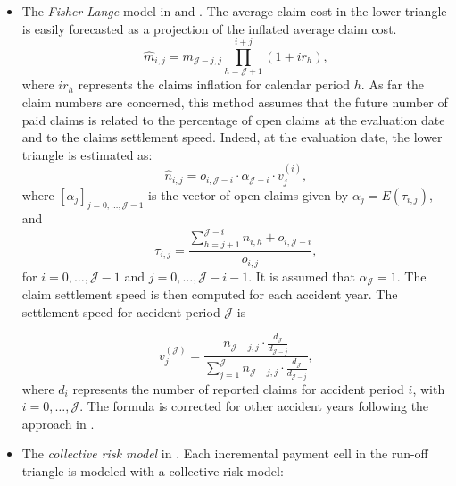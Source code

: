 \documentclass{article}
\begin{document}
\begin{itemize}

    \item The \textit{Fisher-Lange} model in \cite{fisher99} and \cite{savelliDATA}. 
    The average claim cost in the lower triangle is easily forecasted as a projection of the inflated average claim cost. 
    \begin{equation}
        \widehat{m}_{i, j}=m_{\mathcal{J}-j, j} \prod_{h=\mathcal{J}+1}^{i+j}\left(1+ir_h\right),
    \end{equation}
    where $ir_h$ represents the claims inflation for calendar period $h$.
    \newline
    As far the claim numbers are concerned, this method assumes that the future number of paid claims is related to the percentage of open claims at the evaluation date and to the claims settlement speed. Indeed, at the evaluation date, the lower triangle is estimated as:
    \begin{equation}
        \hat{n}_{i, j}=o_{i, \mathcal{J}-i} \cdot \alpha_{\mathcal{J}-i} \cdot v_j^{(i)},
    \end{equation}
    where $\left[\alpha_j\right]_{j=0, \ldots,\mathcal{J}-1}$ is the vector of open claims given by $\alpha_j = E\left( \tau_{i, j}\right)$, and
    \begin{equation}
        \tau_{i, j}=\frac{\sum_{h=j+1}^{\mathcal{J}-i} n_{i, h}+o_{i, \mathcal{J}-i}}{o_{i, j}},
    \end{equation}
    for $i=0, \ldots, \mathcal{J}-1$ and $j=0, \ldots, \mathcal{J}-i-1$. It is assumed that $\alpha_\mathcal{J}=1$.
    The claim settlement speed is then computed for each accident year. The settlement speed for accident period $\mathcal{J}$ is
    
    \begin{equation}
        v_j^{(\mathcal{J})}=\frac{n_{\mathcal{J}-j, j} \cdot \frac{d_\mathcal{J}}{d_{\mathcal{J}-j}}}{\sum_{j=1}^\mathcal{J} n_{\mathcal{J}-j, j} \cdot \frac{d_\mathcal{J}}{d_{\mathcal{J}-j}}},
    \end{equation}
    where $d_i$ represents the number of reported claims for accident period $i$, with $i=0,\ldots,\mathcal{J}$. The formula is corrected for other accident years following the approach in \cite[p.~141]{savelliDATA}.
    \item The \textit{collective risk model} in \cite{ricotta16, clemente19}. Each incremental payment cell in the run-off triangle is modeled with a collective risk model:
    

\end{itemize}
\end{document}
